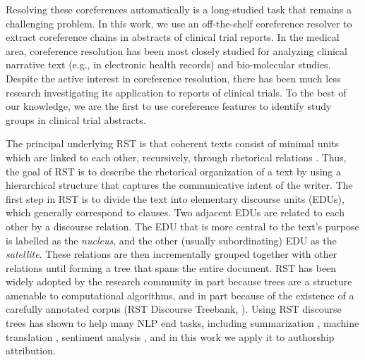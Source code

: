 Resolving these coreferences automatically is a long-studied task that remains a challenging problem.
In this work, we use an off-the-shelf coreference resolver \cite{Clark:2015} to extract coreference chains in abstracts of clinical trial reports. In the medical area, coreference resolution has been most closely studied for analyzing clinical narrative text (e.g.,  in electronic health records) and bio-molecular studies. Despite the active interest in coreference resolution, there has been much less research investigating its application to reports of clinical trials. To the best of our knowledge, we are the first to use coreference features to identify study groups in clinical trial abstracts. 

 The principal underlying RST is that coherent texts consist of minimal units which are linked to each other, recursively, through rhetorical relations \cite{Mann:1988}. Thus, the goal of RST is to describe the rhetorical organization of a text by using a hierarchical structure that captures the communicative intent of the writer. The first step in RST is to divide the text into elementary discourse units (EDUs), which generally correspond to clauses. Two adjacent EDUs are related to each other by a discourse relation. The EDU that is more central to the text's purpose is labelled as the \textit{nucleus}, and the other (usually subordinating) EDU as the \textit{satellite}.
These relations are then incrementally grouped together with other relations until forming a tree that spans the entire document.
RST has been widely adopted by the research community in part because trees are a structure amenable to computational algorithms, and in part because of the existence of a carefully annotated corpus (RST Discourse Treebank, \citet{[RST-DT;][]Carlson:2001}). Using RST discourse trees has shown to help many NLP end tasks, including summarization \cite{Hirao:2013,Durrett:2016}, machine translation \cite{Joty:2017}, sentiment analysis \cite{Ji:2017}, and in this work we apply it to authorship attribution.

